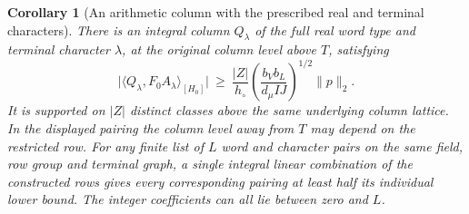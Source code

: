 \documentclass[a4paper,11pt]{article}
\newtheorem{corollary}[proposition]{Corollary}
\theoremstyle{definition}
\theoremstyle{remark}
\numberwithin{equation}{section}
\begin{document}
\begin{corollary}[An arithmetic column with the prescribed real and terminal characters]\leavevmode
\label{cor:column276}
There is an integral column \(Q_\lambda\) of the full real
word type and terminal character \(\lambda\), at the original
column level above \(T\), satisfying
\[
   \big|\langle Q_\lambda,F_0 A_\lambda\rangle_{[H_0]}\big|
    \ \ge\ \frac{|Z|}{h_\circ}
       \left(\frac{b_V b_L}{d_\mu I J}\right)^{1/2}\|p\|_2 .
\]
It is supported on \(|Z|\) distinct classes above the same
underlying column lattice. In the displayed pairing the
column level away from \(T\) may depend on the restricted row.
For any finite list of \(L\) word and character pairs on the
same field, row group and terminal graph, a single integral
linear combination of the constructed rows gives every
corresponding pairing at least half its individual lower bound.
The integer coefficients can all lie between zero and \(L\).
\end{corollary}
\end{document}
